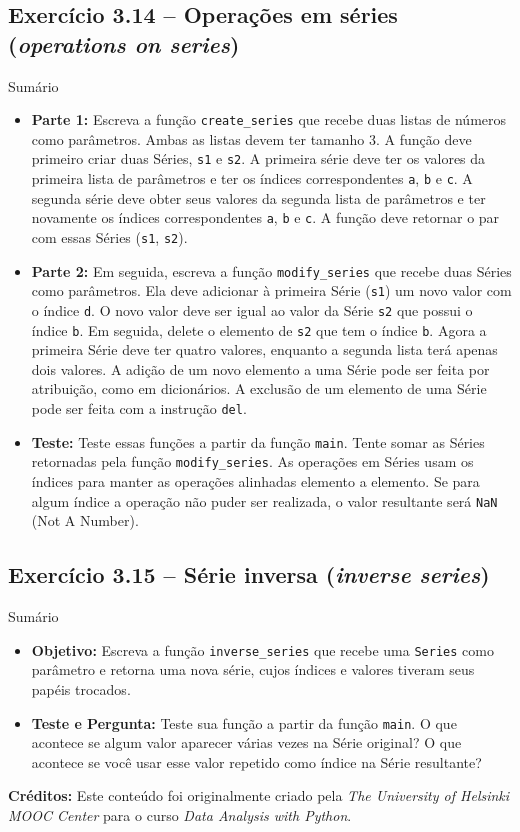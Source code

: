 \documentclass[11pt,a4paper]{article}
\begin{document}
\subsection*{Exercício 3.14 -- Operações em séries (\textit{operations on series})}
\begin{exercicio}{Sumário}
\begin{itemize}
    \item \textbf{Parte 1:} Escreva a função \texttt{create\_series} que recebe duas listas de números como parâmetros. Ambas as listas devem ter tamanho 3. A função deve primeiro criar duas Séries, \texttt{s1} e \texttt{s2}. A primeira série deve ter os valores da primeira lista de parâmetros e ter os índices correspondentes \texttt{a}, \texttt{b} e \texttt{c}. A segunda série deve obter seus valores da segunda lista de parâmetros e ter novamente os índices correspondentes \texttt{a}, \texttt{b} e \texttt{c}. A função deve retornar o par com essas Séries (\texttt{s1}, \texttt{s2}).
    \item \textbf{Parte 2:} Em seguida, escreva a função \texttt{modify\_series} que recebe duas Séries como parâmetros. Ela deve adicionar à primeira Série (\texttt{s1}) um novo valor com o índice \texttt{d}. O novo valor deve ser igual ao valor da Série \texttt{s2} que possui o índice \texttt{b}. Em seguida, delete o elemento de \texttt{s2} que tem o índice \texttt{b}. Agora a primeira Série deve ter quatro valores, enquanto a segunda lista terá apenas dois valores. A adição de um novo elemento a uma Série pode ser feita por atribuição, como em dicionários. A exclusão de um elemento de uma Série pode ser feita com a instrução \texttt{del}.
    \item \textbf{Teste:} Teste essas funções a partir da função \texttt{main}. Tente somar as Séries retornadas pela função \texttt{modify\_series}. As operações em Séries usam os índices para manter as operações alinhadas elemento a elemento. Se para algum índice a operação não puder ser realizada, o valor resultante será \texttt{NaN} (Not A Number).
\end{itemize}
\end{exercicio}

\subsection*{Exercício 3.15 -- Série inversa (\textit{inverse series})}
\begin{exercicio}{Sumário}
\begin{itemize}
    \item \textbf{Objetivo:} Escreva a função \texttt{inverse\_series} que recebe uma \texttt{Series} como parâmetro e retorna uma nova série, cujos índices e valores tiveram seus papéis trocados.
    \item \textbf{Teste e Pergunta:} Teste sua função a partir da função \texttt{main}. O que acontece se algum valor aparecer várias vezes na Série original? O que acontece se você usar esse valor repetido como índice na Série resultante?
\end{itemize}
\end{exercicio}

\vspace{2em}
\noindent\textbf{Créditos:} Este conteúdo foi originalmente criado pela \textit{The University of Helsinki MOOC Center} para o curso \textit{Data Analysis with Python}.
\end{document}
